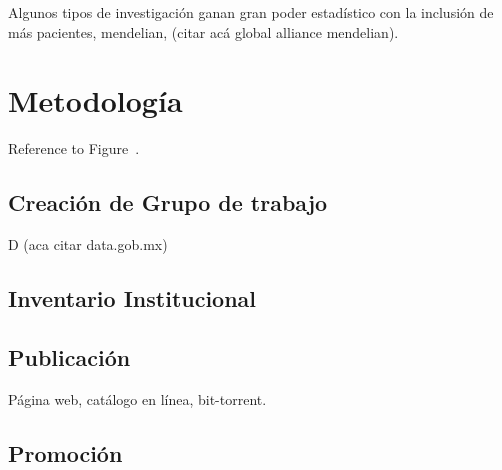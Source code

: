\documentclass[
10pt, %
letterpaper, %
oneside, %
headinclude,footinclude, %
BCOR5mm, %
]{scrartcl}
\begin{document}
Algunos tipos de investigación ganan gran poder estadístico con la
inclusión de más pacientes, mendelian, (citar acá global alliance
mendelian). 


\section{Metodología}
Reference to Figure~. %


\subsection{Creación de Grupo de trabajo}
D
(aca citar data.gob.mx)

\subsection{Inventario Institucional}
\cite{_nih_????}

\subsection{Publicación}
Página web, catálogo en línea, bit-torrent.

\subsection{Promoción}
\cite{schofield_post-publication_2009}



\renewcommand{\refname}{\spacedlowsmallcaps{References}} %



%


\end{document}
